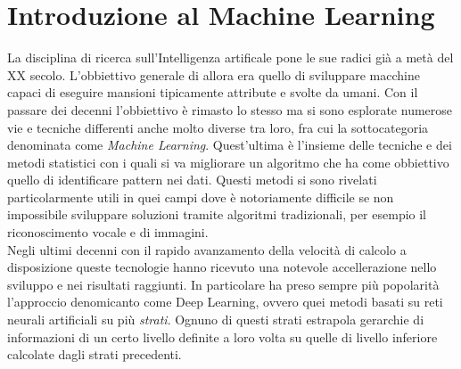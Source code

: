 \documentclass[12pt,a4paper,openright,twoside]{report}
\begin{document}


\chapter{Introduzione al Machine Learning}                %
\lhead[\fancyplain{}{\bfseries\thepage}]{\fancyplain{}{\bfseries\rightmark}}
La disciplina di ricerca sull'Intelligenza artificale pone le sue radici già a metà del XX secolo. L'obbiettivo generale di allora era quello di sviluppare macchine capaci di eseguire mansioni tipicamente attribute e svolte da umani. 
Con il passare dei decenni l'obbiettivo è rimasto lo stesso ma si sono esplorate numerose vie e tecniche differenti anche molto diverse tra loro, fra cui la sottocategoria denominata come \emph{Machine Learning}. Quest'ultima è l'insieme delle tecniche e dei metodi statistici con i quali si va migliorare un algoritmo che ha come obbiettivo quello di identificare pattern nei dati. 
Questi metodi si sono rivelati particolarmente utili in quei campi dove è notoriamente difficile se non impossibile sviluppare soluzioni tramite algoritmi tradizionali, per esempio il riconoscimento vocale e di immagini.\\
Negli ultimi decenni con il rapido avanzamento della velocità di calcolo a disposizione queste tecnologie hanno ricevuto una notevole accellerazione nello sviluppo e nei risultati raggiunti. 
In particolare ha preso sempre più popolarità l'approccio denomicanto come Deep Learning, ovvero quei metodi basati su reti neurali artificiali su più \emph{strati}. Ognuno di questi strati estrapola gerarchie di informazioni di un certo livello definite a loro volta su quelle di livello inferiore calcolate dagli strati precedenti.
\end{document}
